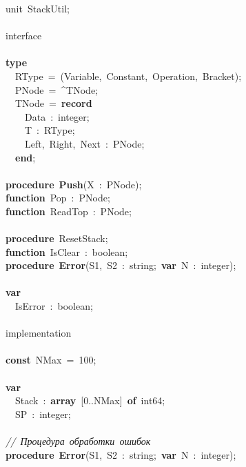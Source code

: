 \noindent
\mbox{}unit\ StackUtil; \\
\mbox{} \\
\mbox{}interface \\
\mbox{} \\
\mbox{}\textbf{type} \\
\mbox{}\ \ RType\ =\ (Variable,\ Constant,\ Operation,\ Bracket); \\
\mbox{}\ \ PNode\ =\ \textasciicircum{}TNode; \\
\mbox{}\ \ TNode\ =\ \textbf{record} \\
\mbox{}\ \ \ \ Data\ :\ integer; \\
\mbox{}\ \ \ \ T\ :\ RType; \\
\mbox{}\ \ \ \ Left,\ Right,\ Next\ :\ PNode; \\
\mbox{}\ \ \textbf{end}; \\
\mbox{} \\
\mbox{}\textbf{procedure}\ \textbf{Push}(X\ :\ PNode); \\
\mbox{}\textbf{function}\ Pop\ :\ PNode; \\
\mbox{}\textbf{function}\ ReadTop\ :\ PNode; \\
\mbox{} \\
\mbox{}\textbf{procedure}\ ResetStack; \\
\mbox{}\textbf{function}\ IsClear\ :\ boolean; \\
\mbox{}\textbf{procedure}\ \textbf{Error}(S1,\ S2\ :\ string;\ \textbf{var}\ N\ :\ integer); \\
\mbox{} \\
\mbox{}\textbf{var} \\
\mbox{}\ \ IsError\ :\ boolean; \\
\mbox{} \\
\mbox{}implementation \\
\mbox{} \\
\mbox{}\textbf{const}\ NMax\ =\ 100; \\
\mbox{} \\
\mbox{}\textbf{var} \\
\mbox{}\ \ Stack\ :\ \textbf{array}\ [0..NMax]\ \textbf{of}\ int64; \\
\mbox{}\ \ SP\ :\ integer; \\
\mbox{} \\
\mbox{}\textit{//\ Процедура\ обработки\ ошибок} \\
\mbox{}\textbf{procedure}\ \textbf{Error}(S1,\ S2\ :\ string;\ \textbf{var}\ N\ :\ integer); \\
